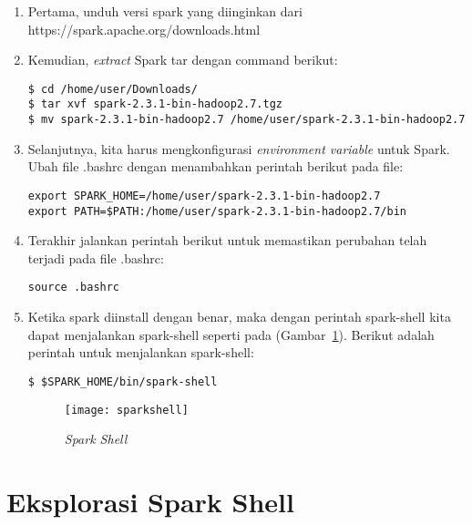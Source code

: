 \begin{enumerate}

\item Pertama, unduh versi spark yang diinginkan  dari https://spark.apache.org/downloads.html

\item Kemudian, \textit{extract} Spark tar dengan command berikut:

\begin{verbatim}
$ cd /home/user/Downloads/ 
$ tar xvf spark-2.3.1-bin-hadoop2.7.tgz 
$ mv spark-2.3.1-bin-hadoop2.7 /home/user/spark-2.3.1-bin-hadoop2.7 
\end{verbatim}

\item Selanjutnya, kita harus mengkonfigurasi \textit{environment variable} untuk Spark. Ubah file .bashrc dengan menambahkan perintah berikut pada file:

\begin{verbatim}
export SPARK_HOME=/home/user/spark-2.3.1-bin-hadoop2.7
export PATH=$PATH:/home/user/spark-2.3.1-bin-hadoop2.7/bin
\end{verbatim}

\item Terakhir jalankan perintah berikut untuk memastikan perubahan telah terjadi pada file .bashrc:

\begin{verbatim}
source .bashrc
\end{verbatim}

\item Ketika spark diinstall dengan benar, maka dengan perintah spark-shell kita dapat menjalankan spark-shell seperti pada (Gambar~\ref{fig:sparkshell}). Berikut adalah perintah untuk menjalankan spark-shell:

\begin{verbatim}
$ $SPARK_HOME/bin/spark-shell
\end{verbatim}

\begin{figure}[H]
    \centering  
    \texttt{[image: sparkshell]}  
    \caption[{\it Spark Shell} ]{{\it Spark Shell}} 
    \label{fig:sparkshell} 
\end{figure}

\end{enumerate}


\section{Eksplorasi Spark Shell}

